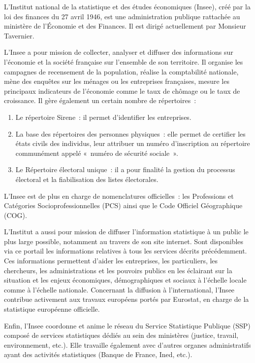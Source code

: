 L'Institut national de la statistique et des études économiques (Insee), créé par la loi des finances du 27 avril 1946, est une administration publique rattachée au ministère de l'Économie et des Finances. Il est dirigé actuellement par Monsieur Tavernier.
\newline

L'Insee a pour mission de collecter, analyser et diffuser des informations sur l'économie et la société française sur l'ensemble de son territoire. Il organise les campagnes de recensement de la population, réalise la comptabilité nationale, mène des enquêtes sur les ménages ou les entreprises françaises, mesure les principaux indicateurs de l'économie comme le taux de chômage ou le taux de croissance. Il gère également un certain nombre de répertoires~:
\begin{enumerate}
    \item Le répertoire Sirene~: il permet d'identifier les entreprises.
    \item La base des répertoires des personnes physiques~: elle permet de certifier les états civils des individus, leur attribuer un numéro d'inscription au répertoire communément appelé «~numéro de sécurité sociale~».
    \item Le Répertoire électoral unique~: il a pour finalité la gestion du processus électoral et la fiabilisation des listes électorales.
\end{enumerate}

L'Insee est de plus en charge de nomenclatures officielles~: les Professions et Catégories Socioprofessionnelles (PCS) ainsi que le Code Officiel Géographique (COG).
\newline

L'Institut a aussi pour mission de diffuser l'information statistique à un public le plus large possible, notamment au travers de son site internet. Sont disponibles via ce portail les informations relatives à tous les services décrits précédemment. Ces informations permettent d'aider les entreprises, les particuliers, les chercheurs, les administrations et les pouvoirs publics en les éclairant sur la situation et les enjeux économiques, démographiques et sociaux à l'échelle locale comme à l'échelle nationale. Concernant la diffusion à l'international, l'Insee contribue activement aux travaux européens portés par Eurostat, en charge de la statistique européenne officielle.
\newline

Enfin, l’Insee coordonne et anime le réseau du Service Statistique Publique (SSP) composé de services statistiques dédiés au sein des ministères (justice, travail, environnement, etc.). Elle travaille également avec d’autres organes administratifs ayant des activités statistiques (Banque de France, Ined, etc.).
\newline

